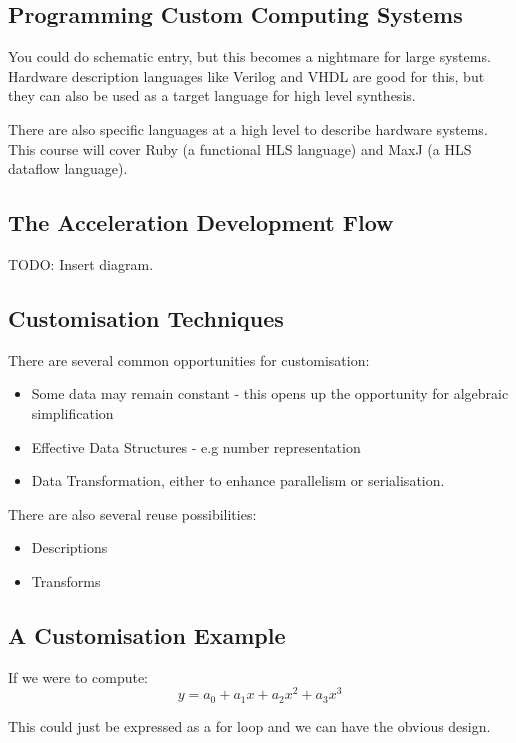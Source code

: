 \documentclass[a4paper]{scrartcl}
\begin{document}
\subsection{Programming Custom Computing Systems}

You could do schematic entry, but this becomes a nightmare for large systems. 
Hardware description languages like Verilog and VHDL are good for this, but they 
can also be used as a target language for high level synthesis. 

There are also specific languages at a high level to describe hardware systems. 
This course will cover Ruby (a functional HLS language) and MaxJ (a HLS dataflow language). 

\subsection{The Acceleration Development Flow}

TODO: Insert diagram. 

\subsection{Customisation Techniques}

There are several common opportunities for customisation:
\begin{itemize}
    \item Some data may remain constant - this opens up the opportunity for algebraic simplification
    \item Effective Data Structures - e.g number representation
    \item Data Transformation, either to enhance parallelism or serialisation.
\end{itemize}

There are also several reuse possibilities:
\begin{itemize}
    \item Descriptions
    \item Transforms
\end{itemize}

\subsection{A Customisation Example}

\begin{example}
    If we were to compute:
    \begin{equation}
        y = a_0 + a_1 x + a_2 x^2 +a_3 x^3
    \end{equation}

    This could just be expressed as a for loop and we can have the obvious design. 
\end{example}
\end{document}
